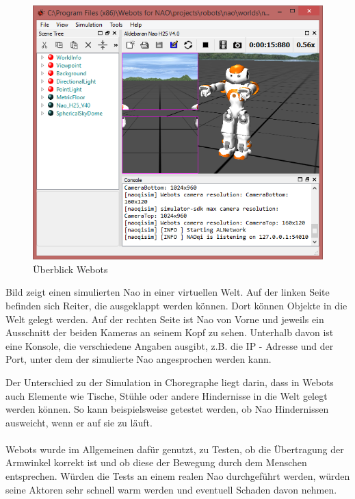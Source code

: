 \begin{figure}[H]						
	\centering							
	\includegraphics[scale=1.0]{Bilder/webots.png}			
	\caption{Überblick Webots}						
	\label{f:nao_webots}						
\end{figure}
\noindent
Bild  zeigt einen simulierten Nao in einer virtuellen Welt. Auf der linken Seite befinden sich Reiter, die ausgeklappt werden können. Dort können Objekte in die Welt gelegt werden. Auf der rechten Seite ist Nao von Vorne und jeweils ein Ausschnitt der beiden Kameras an seinem Kopf zu sehen. Unterhalb davon ist eine Konsole, die verschiedene Angaben ausgibt, z.B. die IP - Adresse und der Port, unter dem der simulierte Nao angesprochen werden kann.

Der Unterschied zu der Simulation in Choregraphe liegt darin, dass in Webots auch Elemente wie Tische, Stühle oder andere Hindernisse in die Welt gelegt werden können. So kann beispielsweise getestet werden, ob Nao Hindernissen ausweicht, wenn er auf sie zu läuft.
\\
\\
Webots wurde im Allgemeinen dafür genutzt, zu Testen, ob die Übertragung der Armwinkel korrekt ist und ob diese der Bewegung durch dem Menschen entsprechen. Würden die Tests an einem realen Nao durchgeführt werden, würden seine Aktoren sehr schnell warm werden und eventuell Schaden davon nehmen.





